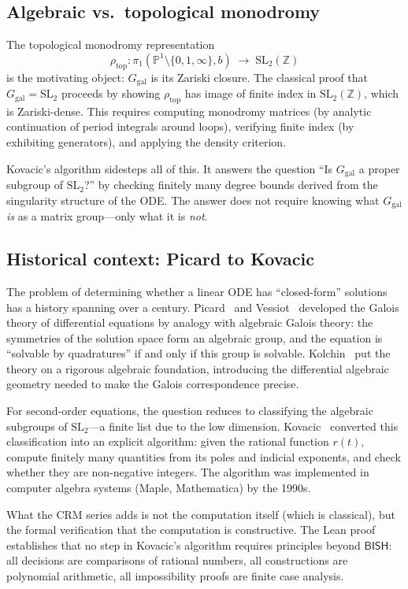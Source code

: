 \documentclass[11pt]{article}
\theoremstyle{plain}
\theoremstyle{definition}
\theoremstyle{remark}
\newcommand{\Z}{\mathbb{Z}}
\newcommand{\SL}{\mathrm{SL}}
\newcommand{\Ggal}{G_{\mathrm{gal}}}
\newcommand{\BISH}{\mathsf{BISH}}
\begin{document}
\subsection{Algebraic vs.\ topological monodromy}

The topological monodromy representation
\[
  \rho_{\mathrm{top}} : \pi_1(\mathbb{P}^1 \setminus \{0,1,\infty\}, b) \;\longrightarrow\; \SL_2(\Z)
\]
is the motivating object: $\Ggal$ is its Zariski closure.
The classical proof that $\Ggal = \SL_2$ proceeds by showing $\rho_{\mathrm{top}}$ has image of finite index in $\SL_2(\Z)$, which is Zariski-dense.
This requires computing monodromy matrices (by analytic continuation of period integrals around loops), verifying finite index (by exhibiting generators), and applying the density criterion.

Kovacic's algorithm sidesteps all of this.
It answers the question ``Is $\Ggal$ a proper subgroup of $\SL_2$?'' by checking finitely many degree bounds derived from the singularity structure of the ODE.
The answer does not require knowing what $\Ggal$ \emph{is} as a matrix group---only what it is \emph{not}.

\subsection{Historical context: Picard to Kovacic}

The problem of determining whether a linear ODE has ``closed-form'' solutions has a history spanning over a century.
Picard~\cite{Picard1896} and Vessiot~\cite{Vessiot1892} developed the Galois theory of differential equations by analogy with algebraic Galois theory: the symmetries of the solution space form an algebraic group, and the equation is ``solvable by quadratures'' if and only if this group is solvable.
Kolchin~\cite{Kolchin1948} put the theory on a rigorous algebraic foundation, introducing the differential algebraic geometry needed to make the Galois correspondence precise.

For second-order equations, the question reduces to classifying the algebraic subgroups of $\SL_2$---a finite list due to the low dimension.
Kovacic~\cite{Kovacic1986} converted this classification into an explicit algorithm: given the rational function $r(t)$, compute finitely many quantities from its poles and indicial exponents, and check whether they are non-negative integers.
The algorithm was implemented in computer algebra systems (Maple, Mathematica) by the 1990s.

What the CRM series adds is not the computation itself (which is classical), but the formal verification that the computation is constructive.
The Lean proof establishes that no step in Kovacic's algorithm requires principles beyond $\BISH$: all decisions are comparisons of rational numbers, all constructions are polynomial arithmetic, all impossibility proofs are finite case analysis.
\end{document}

